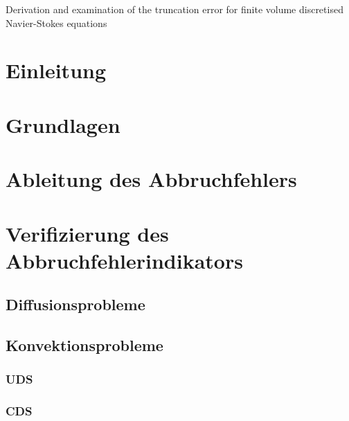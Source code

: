 \documentclass[bigchapter,twoside,report,11pt,type=bsc,colorback,accentcolor=tud2c]{tudthesis}
\begin{document}
%
{Derivation and examination of the truncation error for finite volume discretised Navier-Stokes equations}
\author{Paul Lange}
\dateofexam{\today}{\today}
\makethesistitle
{}

\tableofcontents
\listoffigures

\chapter{Einleitung}

\cleardoublepage

\chapter{Grundlagen}






\cleardoublepage




\chapter{Ableitung des Abbruchfehlers}
\label{chap:herleitung}





\chapter{Verifizierung des Abbruchfehlerindikators}
\section{Diffusionsprobleme}
\section{Konvektionsprobleme}
\subsection{UDS}
\subsection{CDS}
\end{document}
